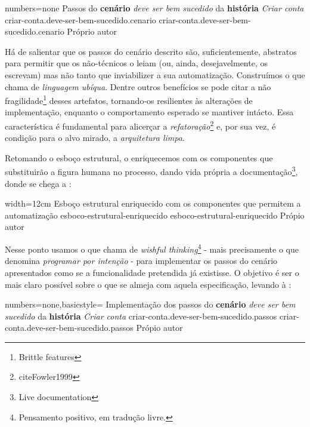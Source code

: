     \codigo
      {numbers=none}
      {Passos do \textbf{cenário} \emph{deve ser bem sucedido} da \textbf{história} \emph{Criar conta}}
      {criar-conta.deve-ser-bem-sucedido.cenario}
      {criar-conta.deve-ser-bem-sucedido.cenario}
      {Próprio autor}

  Há de salientar que os passos do cenário descrito são, suficientemente, abstratos para permitir que os não-técnicos o leiam (ou, ainda, desejavelmente, os escrevam) mas não tanto que inviabilizer a sua automatização. Construímos o que  chama de \emph{linguagem ubíqua}. Dentre outros benefícios se pode citar a não fragilidade\footnote{\cite[pág. 93]{RoseWynneHellesoy2015} Brittle features} desses artefatos, tornando-os resilientes às alterações de implementação, enquanto o comportamento esperado se mantiver intácto. Essa característica é fundamental para alicerçar a \emph{refatoração}\footnote{cite{Fowler1999}} e, por sua vez, é condição para o alvo mirado, a \emph{arquitetura limpa}.

  Retomando o esboço estrutural, o enriquecemos com os componentes que substituirão a figura humana no processo, dando vida própria a documentação\footnote{ Live documentation}, donde se chega a :

  \imagem
    {width=12cm}
    {Esboço estrutural enriquecido com os componentes que permitem a automatização}
    {esboco-estrutural-enriquecido}
    {esboco-estrutural-enriquecido}
    {Própio autor}

  Nesse ponto usamos o que  chama de \emph{wishful thinking}\footnote{Pensamento positivo, em tradução livre.} - mais precisamente o que  denomina \emph{programar por intenção} - para implementar os passos do cenário apresentados como se a funcionalidade pretendida já existisse. O objetivo é ser o mais claro possível sobre o que se almeja com aquela especificação, levando à :

  \codigo
    {numbers=none,basicstyle=\ttfamily\tiny\linespread{0.7}}
    {Implementação dos passos do \textbf{cenário} \emph{deve ser bem sucedido} da \textbf{história} \emph{Criar conta}}
    {criar-conta.deve-ser-bem-sucedido.passos}
    {criar-conta.deve-ser-bem-sucedido.passos}
    {Própio autor}

